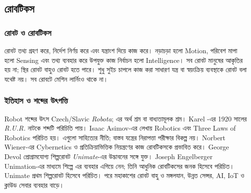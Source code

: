 \subsection{রোবটিকস}
\label{sec:ch1-robotics}
\subsubsection{রোবট ও রোবটিকস}
রোবট তথ্য গ্রহণ করে, নির্দেশ নির্ণয় করে এবং যন্ত্রাংশ দিয়ে কাজ করে। নড়াচড়া হলো Motion, পরিবেশ মাপা হলো Sensing এবং তথ্য ব্যবহার করে উপযুক্ত কাজ নির্বাচন হলো Intelligence। সব রোবট মানুষের আকৃতির হয় না; স্থির রোবট বাহুও রোবট হতে পারে। শুধু সুইচ চাপলে কাজ করা সাধারণ যন্ত্র বা স্বয়ংক্রিয় ব্যবস্থাকে রোবট বলা যথেষ্ট নয়। সব রোবটে মেশিন লার্নিংও থাকে না।
\subsubsection{ইতিহাস ও শব্দের উৎপত্তি}
Robot শব্দের উৎস Czech/Slavic \textit{Robota}; এর অর্থ শ্রম বা বাধ্যতামূলক শ্রম। Karel -এর 1920 সালের \textit{R.U.R.} নাটকে শব্দটি পরিচিতি পায়। Isaac Asimov-এর লেখায় Robotics এবং Three Laws of Robotics পরিচিত হয়। এগুলো সাহিত্যের নীতি; বাস্তব যন্ত্রের নিরাপত্তা পরীক্ষার বিকল্প নয়।
Norbert Wiener-এর Cybernetics ও প্রতিক্রিয়াভিত্তিক নিয়ন্ত্রণের কাজ রোবটিকসকে প্রভাবিত করে। George Devol প্রোগ্রামযোগ্য শিল্পরোবট \textit{Unimate}-এর উদ্ভাবনের সঙ্গে যুক্ত। Joseph Engelberger Unimation-এর মাধ্যমে শিল্পে এর ব্যবহার এগিয়ে নেন; তিনি আধুনিক রোবটিকসের জনক হিসেবে পরিচিত। Unimate প্রথম শিল্পরোবট হিসেবে পরিচিত। পরে মহাকাশের রোবট বাহু ও মঙ্গলযান, উন্নত সেন্সর, AI, IoT ও ক্লাউড সেবার ব্যবহার বাড়ে।
